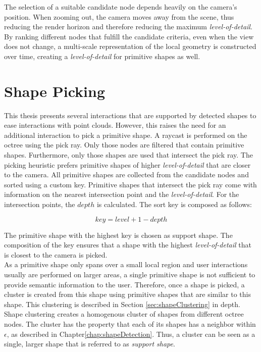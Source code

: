 The selection of a suitable candidate node depends heavily on the camera's position. When zooming out, the camera moves away from the scene, thus reducing the render horizon and therefore reducing the maximum \textit{level-of-detail}. By ranking different nodes that fulfill the candidate criteria, even when the view does not change, a multi-scale representation of the local geometry is constructed over time, creating a \textit{level-of-detail} for primitive shapes as well. 


\section{Shape Picking}
\label{sec:shapePicking}

This thesis presents several interactions that are supported by detected shapes to ease interactions with point clouds.  
However, this raises the need for an additional interaction to pick a primitive shape. A raycast is performed on the octree using the pick ray. Only those nodes are filtered that contain primitive shapes. Furthermore, only those shapes are used that intersect the pick ray. The picking heuristic prefers primitive shapes of higher \textit{level-of-detail} that are closer to the camera. All primitive shapes are collected from the candidate nodes and sorted using a custom key. Primitive shapes that intersect the pick ray come with information on the nearest intersection point and the \textit{level-of-detail}. For the intersection points, the $depth$ is calculated. The sort key is composed as follows: 

$$key = level + 1 - depth$$

The primitive shape with the highest key is chosen as support shape. The composition of the key ensures that a shape with the highest \textit{level-of-detail} that is closest to the camera is picked.
\\
As a primitive shape only spans over a small local region and user interactions usually are performed on larger areas, a single primitive shape is not sufficient to provide semantic information to the user. Therefore, once a shape is picked, a cluster is created from this shape using primitive shapes that are similar to this shape. This clustering is described in Section \ref{sec:shapeClustering} in depth. Shape clustering creates a homogenous cluster of shapes from different octree nodes. The cluster has the property that each of its shapes has a neighbor within $\epsilon$,
 as described in Chapter\ref{chap:shapeDetection}. Thus, a cluster can be seen as a single, larger shape that is referred to as \textit{support shape}.


